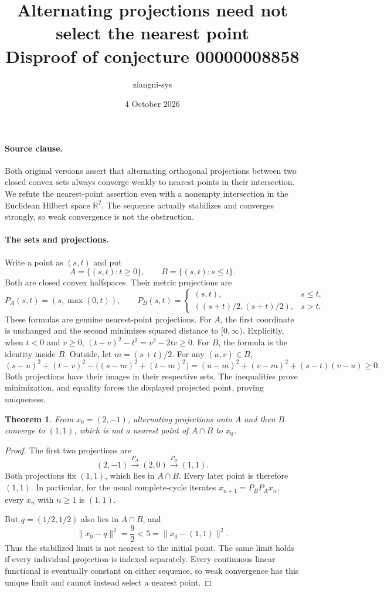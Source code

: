\documentclass[11pt]{article}
\title{Alternating projections need not select the nearest point\\Disproof of conjecture 00000008858}
\author{ziangni-sys}
\date{4 October 2026}
\newtheorem{theorem}{Theorem}
\begin{document}
\maketitle
\paragraph{Source clause.}
Both original versions assert that alternating orthogonal projections between two closed convex sets always converge weakly to nearest points in their intersection. We refute the nearest-point assertion even with a nonempty intersection in the Euclidean Hilbert space $\mathbb R^2$. The sequence actually stabilizes and converges strongly, so weak convergence is not the obstruction.

\paragraph{The sets and projections.}
Write a point as $(s,t)$ and put
\[
 A=\{(s,t):t\ge0\},\qquad B=\{(s,t):s\le t\}.
\]
Both are closed convex halfspaces. Their metric projections are
\[
 P_A(s,t)=(s,\max(0,t)),\qquad
 P_B(s,t)=
 \begin{cases}
 (s,t),&s\le t,\\
 ((s+t)/2,(s+t)/2),&s>t.
 \end{cases}
\]
These formulas are genuine nearest-point projections. For $A$, the first coordinate is unchanged and the second minimizes squared distance to $[0,\infty)$. Explicitly, when $t<0$ and $v\ge0$,
$(t-v)^2-t^2=v^2-2tv\ge0$.
For $B$, the formula is the identity inside $B$. Outside, let $m=(s+t)/2$. For any $(u,v)\in B$,
\[
 (s-u)^2+(t-v)^2-\bigl((s-m)^2+(t-m)^2\bigr)
 =(u-m)^2+(v-m)^2+(s-t)(v-u)\ge0.
\]
Both projections have their images in their respective sets. The inequalities prove minimization, and equality forces the displayed projected point, proving uniqueness.

\begin{theorem}
From $x_0=(2,-1)$, alternating projections onto $A$ and then $B$ converge to $(1,1)$, which is not a nearest point of $A\cap B$ to $x_0$.
\end{theorem}
\begin{proof}
The first two projections are
\[
 (2,-1)\xrightarrow{P_A}(2,0)\xrightarrow{P_B}(1,1).
\]
Both projections fix $(1,1)$, which lies in $A\cap B$. Every later point is therefore $(1,1)$. In particular, for the usual complete-cycle iterates $x_{n+1}=P_BP_Ax_n$, every $x_n$ with $n\ge1$ is $(1,1)$.

But $q=(1/2,1/2)$ also lies in $A\cap B$, and
\[
 \|x_0-q\|^2=\frac92<5=\|x_0-(1,1)\|^2.
\]
Thus the stabilized limit is not nearest to the initial point. The same limit holds if every individual projection is indexed separately. Every continuous linear functional is eventually constant on either sequence, so weak convergence has this unique limit and cannot instead select a nearest point.
\end{proof}
\end{document}
